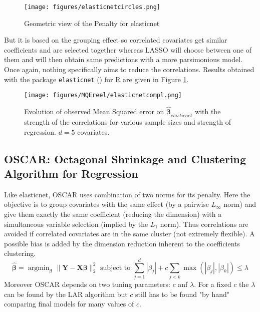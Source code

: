 \documentclass[12pt,a4paper]{report}
\begin{document}
	
	\begin{figure}[h!]
			\centering
			\texttt{[image: figures/elasticnetcircles.png]} 
			\caption{Geometric view of the Penalty for elasticnet}
		\end{figure}	
	
	But it is based on the grouping effect so correlated covariates get similar coefficients and are selected together whereas LASSO will choose between one of them and will then obtain same predictions with a more parsimonious model. Once again, nothing specifically aims to reduce the correlations. Results obtained with the package {\tt elasticnet} (\cite{packageelasticnet}) for R are given in Figure \ref{MQEelasticnetcompl}.

	
	 \begin{figure}
	 \centering
	  \texttt{[image: figures/MQEreel/elasticnetcompl.png]}
	  \caption{Evolution of observed Mean Squared error on $\hat{\boldsymbol{\beta}}_{elasticnet}$ with the strength of the correlations for various sample sizes and strength of regression. $d=5$ covariates. } \label{MQEelasticnetcompl}
	\end{figure}
		
		 \FloatBarrier

		\subsection{OSCAR: Octagonal Shrinkage and Clustering Algorithm for Regression}		%

			Like elasticnet, \textsc{OSCAR} \cite{bondell2008simultaneous} uses combination of two norms for its penalty. Here the objective is to group covariates with the same effect (by a pairwise $L_\infty$ norm) and give them exactly the same coefficient (reducing the dimension) with a simultaneous variable selection (implied by the $L_1$ norm). Thus correlations are avoided if correlated covariates are in the same cluster (not extremely flexible). A possible bias is added by the dimension reduction inherent to the coefficients clustering.
			\begin{equation}
				\hat{\boldsymbol{\beta}}=\operatorname{argmin}_{\boldsymbol{\beta}} \parallel\boldsymbol{Y}-\boldsymbol{X}\boldsymbol{\beta} \parallel^2_2 \textrm{ subject to } \sum_{j=1}^d|\beta_j|+c\sum_{j<k}\operatorname{max}(|\beta_j|,|\beta_k|) \leq \lambda		
			\end{equation}						
			Moreover \textsc{OSCAR} depends on two tuning parameters: $c$ anf $\lambda$. For a fixed $c$ the $\lambda$ can be found by the \textsc{LAR} algorithm but $c$ still has to be found "by hand" comparing final models for many values of $c$.
			
\end{document}
